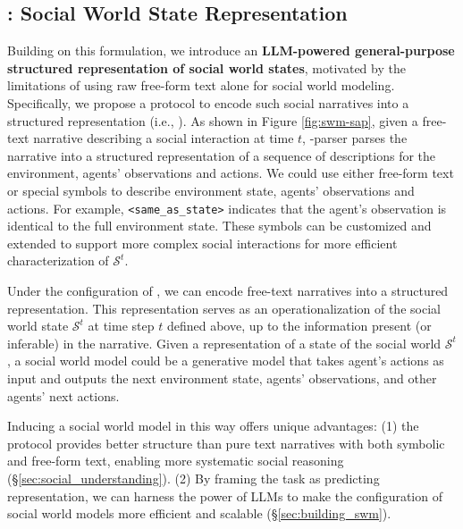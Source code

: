 \subsection{\protocolname: Social World State Representation}\label{ssec:sssap-definition}
Building on this formulation, we introduce an \textbf{LLM-powered general-purpose structured representation of social world states}, motivated by the limitations of using raw free-form text alone for social world modeling.
Specifically, we propose a protocol to encode such social narratives into a structured representation (i.e., \protocolname).
As shown in Figure \ref{fig:swm-sap}, given a free-text narrative describing a social interaction at time $t$,  \protocolname-parser parses the narrative into a structured representation of a sequence of descriptions for the environment, agents' observations and actions.
We could use either free-form text or special symbols to describe environment state, agents' observations and actions.
For example, \texttt{<same\_as\_state>} indicates that the agent’s observation is identical to the full environment state.
These symbols can be customized and extended to support more complex social interactions for more efficient characterization of $\mathcal{S}^t$.

Under the configuration of \protocolname, we can encode free-text narratives into a structured representation.
This representation serves as an operationalization of the social world state $\mathcal{S}^t$ at time step $t$ defined above, up to the information present (or inferable) in the narrative.
Given a \protocolname representation of a state of the social world $\mathcal{S}^t$, a social world model could be a generative model that takes agent's actions as input and outputs the next environment state, agents' observations, and other agents' next actions.

Inducing a social world model in this way offers unique advantages:
(1) the protocol provides better structure than pure text narratives with both symbolic and free-form text, enabling more systematic social reasoning (\S \ref{sec:social_understanding}).
(2) By framing the task as predicting \protocolname representation, we can harness the power of LLMs to make the configuration of social world models more efficient and scalable (\S \ref{sec:building_swm}).

